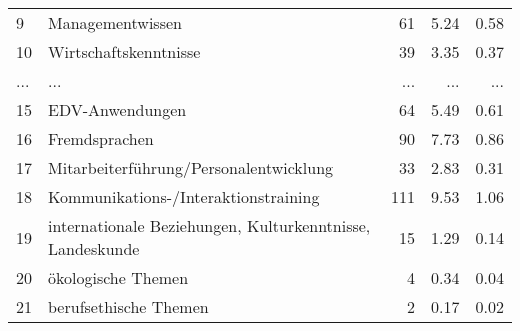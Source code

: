 \begin{longtable}{lXrrr}
        9 & \multicolumn{1}{X}{Managementwissen} & %
          \num{61} &
          \num[round-mode=places,round-precision=2]{5.24} &
          \num[round-mode=places,round-precision=2]{0.58} \\
        10 & \multicolumn{1}{X}{Wirtschaftskenntnisse} & %
          \num{39} &
          \num[round-mode=places,round-precision=2]{3.35} &
          \num[round-mode=places,round-precision=2]{0.37} \\
       ... & ... & ... & ... & ... \\
        15 & \multicolumn{1}{X}{EDV-Anwendungen} & %
          \num{64} &
          \num[round-mode=places,round-precision=2]{5.49} &
          \num[round-mode=places,round-precision=2]{0.61} \\

        16 & \multicolumn{1}{X}{Fremdsprachen} & %
          \num{90} &
          \num[round-mode=places,round-precision=2]{7.73} &
          \num[round-mode=places,round-precision=2]{0.86} \\

        17 & \multicolumn{1}{X}{Mitarbeiterführung/Personalentwicklung} & %
          \num{33} &
          \num[round-mode=places,round-precision=2]{2.83} &
          \num[round-mode=places,round-precision=2]{0.31} \\

        18 & \multicolumn{1}{X}{Kommunikations-/Interaktionstraining} & %
          \num{111} &
          \num[round-mode=places,round-precision=2]{9.53} &
          \num[round-mode=places,round-precision=2]{1.06} \\

        19 & \multicolumn{1}{X}{internationale Beziehungen, Kulturkenntnisse, Landeskunde} & %
          \num{15} &
          \num[round-mode=places,round-precision=2]{1.29} &
          \num[round-mode=places,round-precision=2]{0.14} \\

        20 & \multicolumn{1}{X}{ökologische Themen} & %
          \num{4} &
          \num[round-mode=places,round-precision=2]{0.34} &
          \num[round-mode=places,round-precision=2]{0.04} \\

        21 & \multicolumn{1}{X}{berufsethische Themen} & %
          \num{2} &
          \num[round-mode=places,round-precision=2]{0.17} &
          \num[round-mode=places,round-precision=2]{0.02} \\


\end{longtable}
